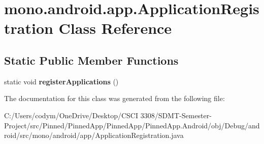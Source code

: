 \hypertarget{classmono_1_1android_1_1app_1_1_application_registration}{}\section{mono.\+android.\+app.\+Application\+Registration Class Reference}
\label{classmono_1_1android_1_1app_1_1_application_registration}
\subsection*{Static Public Member Functions}
\begin{DoxyCompactItemize}
\item 
\mbox{\label{classmono_1_1android_1_1app_1_1_application_registration_aa4d14d9d7a2c1c57a8ddf959fbb71e47}} 
static void {\bfseries register\+Applications} ()
\end{DoxyCompactItemize}


The documentation for this class was generated from the following file\+:\begin{DoxyCompactItemize}
\item 
C\+:/\+Users/codym/\+One\+Drive/\+Desktop/\+C\+S\+C\+I 3308/\+S\+D\+M\+T-\/\+Semester-\/\+Project/src/\+Pinned/\+Pinned\+App/\+Pinned\+App/\+Pinned\+App.\+Android/obj/\+Debug/android/src/mono/android/app/Application\+Registration.\+java\end{DoxyCompactItemize}
